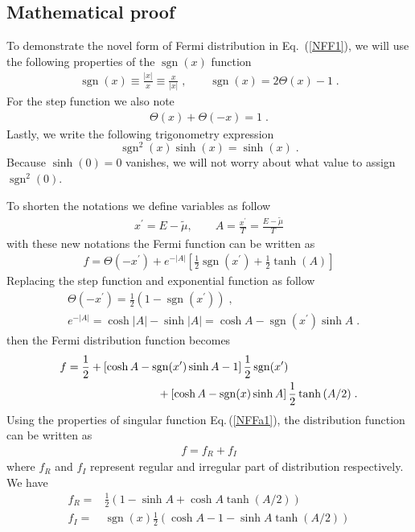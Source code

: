 \documentclass[sn-mathphys,Numbered]{sn-jnl}
\newcommand{\req}[1]{Eq.~(\ref{#1})}
\DeclareMathOperator{\sgn}{sgn}
\begin{document}
\subsection{Mathematical proof}
To demonstrate the novel form of Fermi distribution in \req{NFF1}, we will use the following properties of the $\sgn(x)$ function
\begin{align}\label{NFF2a}
\sgn(x)\equiv\frac{|x|}{x}\equiv\frac{x}{|x|}\;,\qquad
\sgn(x)=2\Theta(x)-1\;.
\end{align}
For the step function we also note
\begin{align}
\label{NFF2c}
\Theta(x)+\Theta(-x)=1\;.
\end{align}
Lastly, we write the following trigonometry expression
\begin{equation}\label{NFFa1}
\sgn^{2}(x)\sinh(x)=\sinh(x)\;.
\end{equation}
Because $\sinh(0)=0$ vanishes, we will not worry about what value to assign $\sgn^{2}(0)$.  

To shorten the notations we define variables as follow
\begin{align}
x^\prime=E-\widetilde\mu,\qquad A = \frac{x^\prime}{T}= \frac{E-\widetilde\mu}{T}
\end{align}
with these new notations the Fermi function can be written as
\begin{align}
f=\Theta(-x^\prime)+e^{-|A|}\left[\frac{1}{2}\sgn\left(x^\prime\right) 
+\frac{1}{2}\tanh\left(A\right)\right]
\end{align}
Replacing the step function and exponential function as  follow
\begin{align}\label{NFF4}
&\Theta(-x^\prime)=\frac 1 2 (1-\sgn(x^\prime))\;,\\ 
&e^{-|A|}=\cosh|A|-\sinh|A|=\cosh A- \sgn(x^\prime)\sinh A\;.
\end{align}
then the Fermi distribution function becomes
\begin{align}
f=\frac{1}{2} &+\left[\cosh {A}- \sgn(x^\prime)\sinh{A} -1\right]\frac{1}{2} \sgn(x^\prime)\notag\\
&\qquad\qquad\qquad+\left[\cosh{A}- \sgn(x)\sinh{A} \right]\frac{1}{2}\tanh{(A/2)}\;.
\end{align}
Using the properties of singular function  Eq.\,(\ref{NFFa1}), the distribution function can be written as
\begin{align}
f=f_R+f_I
\end{align}
where $f_R$ and $f_I$ represent regular and irregular part of distribution respectively. We have
\begin{align}\label{NFF5a}
f_R=& \frac{1}{2}\left(1-\sinh A +\cosh A \tanh (A/2)\right) \\
f_I=& \sgn(x) \frac{1}{2} \left(\cosh A-1 - \sinh A \tanh (A/2)\right)
\label{NFF5b}
\end{align}
\end{document}

